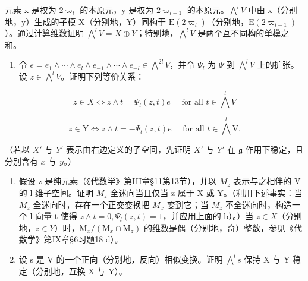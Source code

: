 元素 x 是权为 \(2\varpi_{l}\) 的本原元，y 是权为 \(2\varpi_{l-1}\) 的本原元。\(\bigwedge^{l}V\) 中由 x（分别地，y）生成的子模 X（分别地，Y）同构于 \(\mathrm{E}(2\varpi_{l})\)（分别地，\(\mathrm{E}(2\varpi_{l-1})\)）。通过计算维数证明 \(\bigwedge^{l}V = X \oplus Y\)；特别地，\(\bigwedge^{l}V\) 是两个互不同构的单模之和。

\begin{enumerate}
\def\labelenumi{\alph{enumi})}
\setcounter{enumi}{1}
\tightlist
\item
  令 \(e = e_{1} \wedge \cdots \wedge e_{l} \wedge e_{-1} \wedge \cdots \wedge e_{-l} \in \bigwedge^{2l}V\)，并令 \(\varPsi_{l}\) 为 \(\varPsi\) 到 \(\bigwedge^{l}V\) 上的扩张。设 \(z \in \bigwedge^{l}V\)。证明下列等价关系：
\end{enumerate}

\[
z \in X \Longleftrightarrow z \wedge t = \Psi_ {l} (z, t) e \quad \text {   for   all   } t \in \bigwedge^ {l} V
\]

\[
z \in \mathrm{Y} \Longleftrightarrow z \wedge t = - \Psi_ {l} (z, t) e \quad \text {   for   all   } t \in \bigwedge^ {l} \mathrm{V}.
\]

（若以 \(X'\) 与 \(Y'\) 表示由右边定义的子空间，先证明 \(X'\) 与 \(Y'\) 在 \(\mathfrak{g}\) 作用下稳定，且分别含有 \(x\) 与 \(y\)。）

\begin{enumerate}
\def\labelenumi{\alph{enumi})}
\setcounter{enumi}{2}
\item
  假设 z 是纯元素（《代数学》第III章§11第13节），并以 \(M_{z}\) 表示与之相伴的 V 的 l 维子空间。证明 \(M_{z}\) 全迷向当且仅当 z 属于 X 或 Y。（利用下述事实：当 \(M_{z}\) 全迷向时，存在一个正交变换把 \(M_{x}\) 变到它；当 \(M_{z}\) 不全迷向时，构造一个 l-向量 t 使得 \(z \wedge t = 0, \Psi_{l}(z, t) = 1\)，并应用上面的 b）。）当 \(z \in X\)（分别地，\(z \in Y\)）时，\(\mathrm{M}_{x}/(\mathrm{M}_{x} \cap \mathrm{M}_{z})\) 的维数是偶（分别地，奇）整数，参见《代数学》第IX章§6习题18 d）。
\item
  设 s 是 V 的一个正向（分别地，反向）相似变换。证明 \(\bigwedge^{l}s\) 保持 X 与 Y 稳定（分别地，互换 X 与 Y）。
\end{enumerate}

